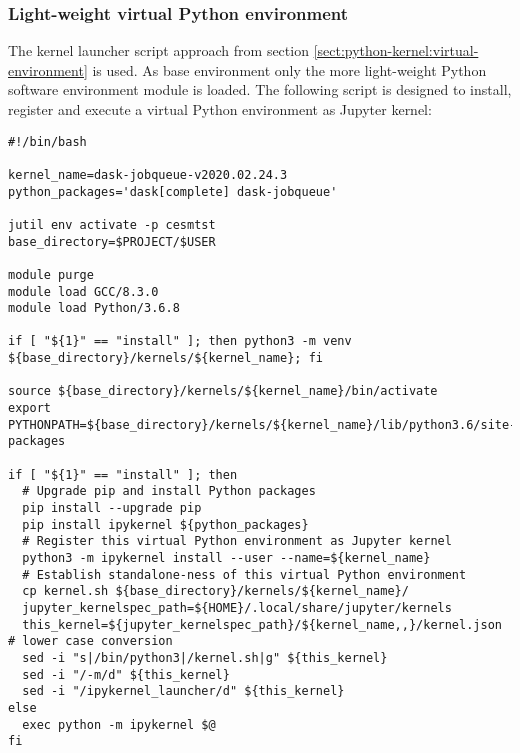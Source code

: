 \documentclass[11pt,a4paper]{article}
\begin{document}
\subsubsection{Light-weight virtual Python environment}
\label{sect:suggested-python-virtual-environment}

The kernel launcher script approach from section \ref{sect:python-kernel:virtual-environment} is used.
As base environment only the more light-weight Python software environment module is loaded.
The following script is designed to install, register and execute a virtual Python environment as Jupyter kernel:
%
\begin{verbatim}
#!/bin/bash

kernel_name=dask-jobqueue-v2020.02.24.3
python_packages='dask[complete] dask-jobqueue'

jutil env activate -p cesmtst
base_directory=$PROJECT/$USER

module purge
module load GCC/8.3.0
module load Python/3.6.8

if [ "${1}" == "install" ]; then python3 -m venv ${base_directory}/kernels/${kernel_name}; fi

source ${base_directory}/kernels/${kernel_name}/bin/activate
export PYTHONPATH=${base_directory}/kernels/${kernel_name}/lib/python3.6/site-packages

if [ "${1}" == "install" ]; then
  # Upgrade pip and install Python packages
  pip install --upgrade pip
  pip install ipykernel ${python_packages}
  # Register this virtual Python environment as Jupyter kernel
  python3 -m ipykernel install --user --name=${kernel_name}
  # Establish standalone-ness of this virtual Python environment
  cp kernel.sh ${base_directory}/kernels/${kernel_name}/
  jupyter_kernelspec_path=${HOME}/.local/share/jupyter/kernels
  this_kernel=${jupyter_kernelspec_path}/${kernel_name,,}/kernel.json # lower case conversion
  sed -i "s|/bin/python3|/kernel.sh|g" ${this_kernel}
  sed -i "/-m/d" ${this_kernel}
  sed -i "/ipykernel_launcher/d" ${this_kernel}
else
  exec python -m ipykernel $@
fi

\end{verbatim}


\end{document}
